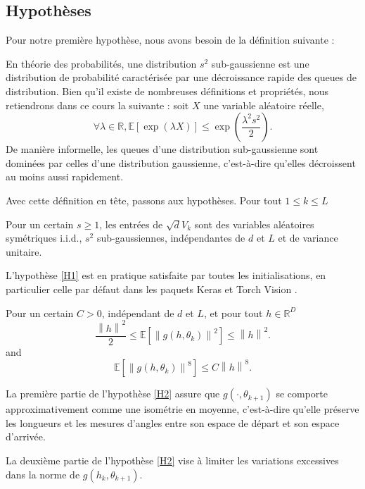 \subsection*{Hypothèses}
Pour notre première hypothèse, nous avons besoin de la définition suivante :
\begin{definition}
    En théorie des probabilités, une distribution $s^2$ sub-gaussienne est une distribution de probabilité caractérisée par une décroissance rapide des queues de distribution. Bien qu'il existe de nombreuses définitions et propriétés, nous retiendrons dans ce cours la suivante : soit $X$ une variable aléatoire réelle,
    \[
        \forall \lambda \in \mathbb{R}, \mathbb{E}[\exp(\lambda X)] \leq \exp\left(\frac{\lambda^2 s^2}{2}\right).
    \]
    De manière informelle, les queues d'une distribution sub-gaussienne sont dominées par celles d'une distribution gaussienne, c'est-à-dire qu'elles décroissent au moins aussi rapidement.
\end{definition}

Avec cette définition en tête, passons aux hypothèses. Pour tout $ 1 \leq  k \leq L  $
\begin{assumption}\label{H1}
    Pour un certain $ s \geq 1 $, les entrées de  $ \sqrt{d}V_k $ sont des variables aléatoires symétriques i.i.d., $ s^2 $ sub-gaussiennes, indépendantes de $ d $ et $ L $ et de variance unitaire.
\end{assumption}
\begin{note}
    L'hypothèse \ref{H1} est en pratique satisfaite par toutes les initialisations, en particulier celle par défaut dans les paquets Keras \cite{chollet2015keras} et Torch Vision \cite{torchvision2016}.
\end{note}

\begin{assumption}\label{H2}
    Pour un certain $ C > 0 $, indépendant de $ d $ et $ L $, et pour tout $ h \in \mathbb{R}^D  $ 
    \[
        \frac{\left\| h \right\| ^2}{2 } \leq  \mathbb{E }[ \left\|  g(h, \theta _ k ) \right\| ^2 ] \leq \left\| h \right\| ^2
    .\]
    and
    \[
        \mathbb{E } [\left\| g(h, \theta _k)  \right\| ^8 ]\leq C \left\| h  \right\| ^8
    .\]
\end{assumption}
\begin{note}
    La première partie de l'hypothèse \ref{H2} assure que $g(\cdot, \theta_{k+1})$ se comporte approximativement comme une isométrie en moyenne, c'est-à-dire qu'elle préserve les longueurs et les mesures d'angles entre son espace de départ et son espace d'arrivée.

    La deuxième partie de l'hypothèse \ref{H2} vise à limiter les variations excessives dans la norme de $g(h_k, \theta_{k+1})$.
\end{note}

